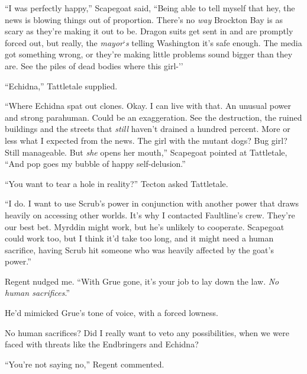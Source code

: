 





``I was perfectly happy,'' Scapegoat said, ``Being able to tell myself that hey, the news is blowing things out of proportion.  There's no \emph{way} Brockton Bay is as scary as they're making it out to be.  Dragon suits get sent in and are promptly forced out, but really, the \emph{mayor}`\emph{s} telling Washington it's safe enough.  The media got something wrong, or they're making little problems sound bigger than they are.  See the piles of dead bodies where this girl-''



``Echidna,'' Tattletale supplied.



``Where Echidna spat out clones.  Okay.  I can live with that.  An unusual power and strong parahuman.  Could be an exaggeration.  See the destruction, the ruined buildings and the streets that \emph{still} haven't drained a hundred percent.  More or less what I expected from the news.  The girl with the mutant dogs?  Bug girl?  Still manageable.  But \emph{she} opens her mouth,'' Scapegoat pointed at Tattletale, ``And pop goes my bubble of happy self-delusion.''



``You want to tear a hole in reality?'' Tecton asked Tattletale.



``I do.  I want to use Scrub's power in conjunction with another power that draws heavily on accessing other worlds.  It's why I contacted Faultline's crew.  They're our best bet.  Myrddin might work, but he's unlikely to cooperate.  Scapegoat could work too, but I think it'd take too long, and it might need a human sacrifice, having Scrub hit someone who was heavily affected by the goat's power.''



Regent nudged me.  ``With Grue gone, it's your job to lay down the law.  \emph{No human sacrifices}.''



He'd mimicked Grue's tone of voice, with a forced lowness.



No human sacrifices?  Did I really want to veto any possibilities, when we were faced with threats like the Endbringers and Echidna?



``You're not saying no,'' Regent commented.



